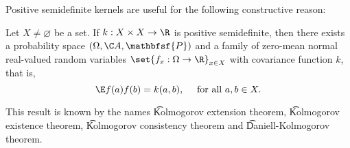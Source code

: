 Positive semidefinite kernels are useful for the following constructive reason:

\begin{proposition}
Let $X \neq \varnothing$ be a set.
If $k: X \times X \to \R $ is positive semidefinite, then there exists a probability space $(\Omega , \C A, \mathbfsf{P} )$ and a family of zero-mean normal real-valued random variables $\set{f_x: \Omega  \to \R }_{x \in X}$ with covariance function $k$, that is,
\[
\E  f(a)f(b) = k(a, b), \quad \text{ for all } a, b \in X.
\]
\end{proposition}

This result is known by the names \t{Kolmogorov extension theorem}, \t{Kolmogorov existence theorem}, \t{Kolmogorov consistency theorem} and \t{Daniell-Kolmogorov theorem}.
\blankpage